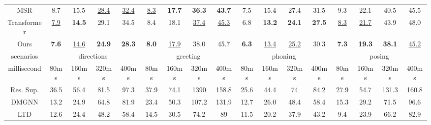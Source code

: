 \begin{table}[h]
{\begin{tabular}{c|cccc|cccc|cccc|cccc}
MSR   & 8.7           & 15.5          & \underline{28.4}          & \underline{32.4}          & \underline{8.3}           & \textbf{17.7} & \textbf{36.3} & \textbf{43.7}  & 7.5           & 15.4          & 27.4          & 31.5          & 9.3           & 22.1          & 40.5          & 45.5          \\
Transformer & \underline{7.9}           & \textbf{14.5} & 29.1          & 34.5          & 8.4           & 18.1          & \underline{37.4}          & \underline{45.3}           & 6.8           & \textbf{13.2} & \textbf{24.1} & \textbf{27.5} & \underline{8.3}           & \underline{21.7}          & 43.9          & 48.0          \\
Ours   & \textbf{7.6}  & \underline{14.6}          & \textbf{24.9} & \textbf{28.3} & \textbf{8.0}  & \underline{17.9}          & 38.0          & 45.7           & \textbf{6.3}  & \underline{13.4}          & \underline{25.2}          & 30.3          & \textbf{7.3}  & \textbf{19.3} & \textbf{38.1} & \underline{45.2}  \\ \hline
scenarios   & \multicolumn{4}{c|}{directions}                                & \multicolumn{4}{c|}{greeting}                                   & \multicolumn{4}{c|}{phoning}                                   & \multicolumn{4}{c}{posing}                                    \\ \hline
millisecond & 80ms          & 160ms         & 320ms         & 400ms         & 80ms          & 160ms         & 320ms         & 400ms          & 80ms          & 160ms         & 320ms         & 400ms         & 80ms          & 160ms         & 320ms         & 400ms         \\ \hline
Res. Sup.   & 36.5          & 56.4          & 81.5          & 97.3          & 37.9          & 74.1          & 1390          & 158.8          & 25.6          & 44.4          & 74            & 84.2          & 27.9          & 54.7          & 131.3         & 160.8         \\
DMGNN       & 13.2          & 24.9          & 64.8          & 81.9          & 23.4          & 50.3          & 107.2         & 131.9          & 12.7          & 26.0          & 48.4          & 58.4          & 15.3          & 29.2          & 71.5          & 96.6          \\
LTD   & 12.6          & 24.4          & 48.2          & 58.4          & 14.5          & 30.5          & 74.2          & 89             & 11.5          & 20.2          & 37.9          & 43.2          & 9.4           & 23.9          & 66.2          & 82.9          \\

\end{tabular}}
\end{table}
